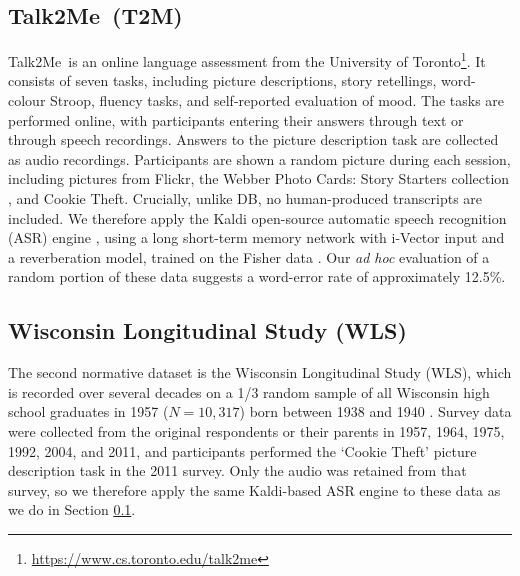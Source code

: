 \documentclass{article}
\newcommand{\talktome}{Talk2Me}
\begin{document}
\subsection{\talktome \ (T2M)}\label{sec:t2m}

 \talktome\ is an online language assessment from the University of Toronto\footnote{\url{https://www.cs.toronto.edu/talk2me}}. It consists of seven tasks, including picture descriptions, story retellings, word-colour Stroop, fluency tasks, and self-reported evaluation of mood. The tasks are performed online, with participants entering their answers through text or through speech recordings. Answers to the picture description task are collected as audio recordings. Participants are shown a random picture during each session, including pictures from Flickr, the Webber Photo Cards: Story Starters collection \cite{Webber2005}, and Cookie Theft. Crucially, unlike DB, no human-produced transcripts are included. We therefore apply the Kaldi open-source automatic speech recognition (ASR) engine \cite{Povey2011}, using a long short-term memory network with i-Vector input \cite{Verma2015} and a reverberation model, trained on the Fisher data \cite{Cieri2005}. Our {\em ad hoc} evaluation of a random portion of these data suggests a word-error rate of approximately 12.5\%.


\subsection{Wisconsin Longitudinal Study (WLS)}

The second normative dataset is the Wisconsin Longitudinal Study (WLS), which is recorded over several decades on a 1/3 random sample of all Wisconsin high school graduates in 1957 ($N=10,317$) born between 1938 and 1940 \cite{Herd2014}. Survey data were collected from the original respondents or their parents in 1957, 1964, 1975, 1992, 2004, and 2011, and participants performed the `Cookie Theft' picture description task in the 2011 survey. Only the audio was retained from that survey, so we therefore apply the same Kaldi-based ASR engine to these data as we do in Section \ref{sec:t2m}.
\end{document}
